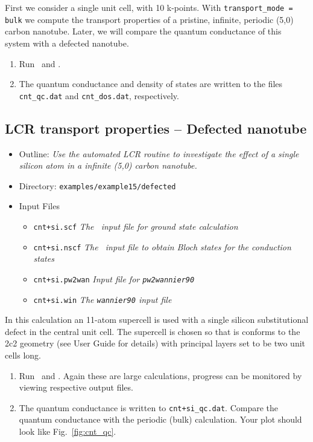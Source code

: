 \documentclass[a4paper,11pt,twoside]{article}
\begin{document}
First we consider a single unit cell, with 10 k-points. With 
{\tt transport\_mode = bulk} we compute the transport properties 
of a pristine, infinite, periodic (5,0) carbon nanotube. Later, we will 
compare the quantum conductance of this system with a defected
nanotube.

\begin{enumerate}
\item Run \pwscf\ and \wannier.\\ 
\item The quantum conductance and density of states are written to the
files {\tt cnt\_qc.dat} and {\tt cnt\_dos.dat}, respectively.
\end{enumerate}

\subsection*{LCR transport properties -- Defected nanotube}

\begin{itemize}
  \item{Outline: \it{Use the automated LCR routine to investigate the effect of
  a single silicon atom in a infinite (5,0) carbon nanotube.}}
  \item{Directory: {\tt examples/example15/defected}}
  \item{Input Files}
    \begin{itemize}
      \item{ {\tt cnt+si.scf}  {\it The \pwscf\ input file for ground state
	  calculation}}
      \item{ {\tt cnt+si.nscf}  {\it The \pwscf\ input file to obtain Bloch
	  states for the conduction states}} 
      \item{ {\tt cnt+si.pw2wan}  {\it Input file for {\tt pw2wannier90}}}
      \item{ {\tt cnt+si.win}  {\it The {\tt wannier90} input file}}
    \end{itemize}
\end{itemize}

In this calculation an 11-atom supercell is used with a single silicon
substitutional defect in the central unit cell. The supercell is
chosen so that is conforms to the 2c2 geometry (see User Guide for
details) with principal layers set to be two unit cells long.

\begin{enumerate}
\item Run \pwscf\ and \wannier. Again these are large calculations, progress
can be monitored by viewing respective output files.\\
\item The quantum conductance is written to {\tt cnt+si\_qc.dat}. 
Compare the quantum conductance with the periodic (bulk) calculation.
Your plot should look like Fig.~\ref{fig:cnt_qc}.

\end{enumerate}
\end{document}
